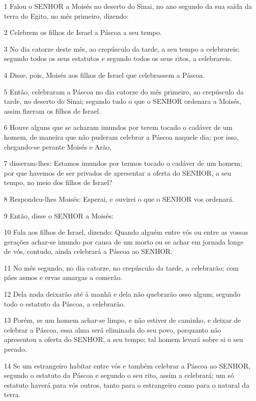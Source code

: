 \par 1 Falou o SENHOR a Moisés no deserto do Sinai, no ano segundo da sua saída da terra do Egito, no mês primeiro, dizendo:
\par 2 Celebrem os filhos de Israel a Páscoa a seu tempo.
\par 3 No dia catorze deste mês, ao crepúsculo da tarde, a seu tempo a celebrareis; segundo todos os seus estatutos e segundo todos os seus ritos, a celebrareis.
\par 4 Disse, pois, Moisés aos filhos de Israel que celebrassem a Páscoa.
\par 5 Então, celebraram a Páscoa no dia catorze do mês primeiro, ao crepúsculo da tarde, no deserto do Sinai; segundo tudo o que o SENHOR ordenara a Moisés, assim fizeram os filhos de Israel.
\par 6 Houve alguns que se acharam imundos por terem tocado o cadáver de um homem, de maneira que não puderam celebrar a Páscoa naquele dia; por isso, chegando-se perante Moisés e Arão,
\par 7 disseram-lhes: Estamos imundos por termos tocado o cadáver de um homem; por que havemos de ser privados de apresentar a oferta do SENHOR, a seu tempo, no meio dos filhos de Israel?
\par 8 Respondeu-lhes Moisés: Esperai, e ouvirei o que o SENHOR vos ordenará.
\par 9 Então, disse o SENHOR a Moisés:
\par 10 Fala aos filhos de Israel, dizendo: Quando alguém entre vós ou entre as vossas gerações achar-se imundo por causa de um morto ou se achar em jornada longe de vós, contudo, ainda celebrará a Páscoa ao SENHOR.
\par 11 No mês segundo, no dia catorze, no crepúsculo da tarde, a celebrarão; com pães asmos e ervas amargas a comerão.
\par 12 Dela nada deixarão até à manhã e dela não quebrarão osso algum; segundo todo o estatuto da Páscoa, a celebrarão.
\par 13 Porém, se um homem achar-se limpo, e não estiver de caminho, e deixar de celebrar a Páscoa, essa alma será eliminada do seu povo, porquanto não apresentou a oferta do SENHOR, a seu tempo; tal homem levará sobre si o seu pecado.
\par 14 Se um estrangeiro habitar entre vós e também celebrar a Páscoa ao SENHOR, segundo o estatuto da Páscoa e segundo o seu rito, assim a celebrará; um só estatuto haverá para vós outros, tanto para o estrangeiro como para o natural da terra.
